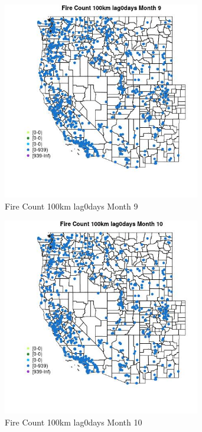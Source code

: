 \begin{figure} 
\centering  
\includegraphics[width=0.77\textwidth]{Code_Outputs/Report_ML_input_PM25_Step4_part_e_de_duplicated_aves_compiled_2019-05-21wNAs_MapObsMo9Fire_Count_100km_lag0days.jpg} 
\caption{\label{fig:Report_ML_input_PM25_Step4_part_e_de_duplicated_aves_compiled_2019-05-21wNAsMapObsMo9Fire_Count_100km_lag0days}Fire Count 100km lag0days Month 9} 
\end{figure} 
 

\begin{figure} 
\centering  
\includegraphics[width=0.77\textwidth]{Code_Outputs/Report_ML_input_PM25_Step4_part_e_de_duplicated_aves_compiled_2019-05-21wNAs_MapObsMo10Fire_Count_100km_lag0days.jpg} 
\caption{\label{fig:Report_ML_input_PM25_Step4_part_e_de_duplicated_aves_compiled_2019-05-21wNAsMapObsMo10Fire_Count_100km_lag0days}Fire Count 100km lag0days Month 10} 
\end{figure} 
 

